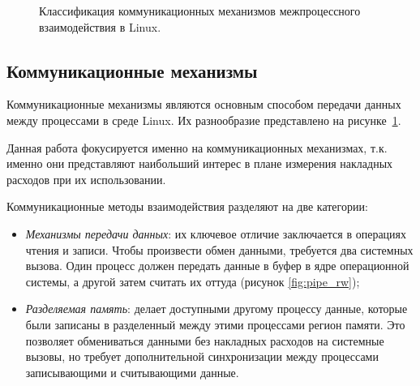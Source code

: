 \documentclass[14pt, russian]{scrartcl}
\newcommand{\refImage}[1]{(рисунок \ref{#1})}
\begin{document}
\begin{figure}[H]
\begin{minipage}[t]{\textwidth}
  \end{minipage}
  \caption{Классификация коммуникационных механизмов межпроцессного взаимодействия в Linux.}
  \label{fig:communication_ipc_taxonomy}
\end{figure}

\subsection{Коммуникационные механизмы}

Коммуникационные механизмы являются основным способом передачи данных между
процессами в среде Linux. Их разнообразие представлено на
рисунке~\ref{fig:communication_ipc_taxonomy}.

Данная работа фокусируется именно на коммуникационных механизмах, т.к. именно
они представляют наибольший интерес в плане измерения накладных расходов при их
использовании.

Коммуникационные методы взаимодействия разделяют на две
категории:\cite{kerrisk2010linux}

\begin{itemize}
  \item \emph{Механизмы передачи данных}: их ключевое отличие заключается в
        операциях чтения и записи. Чтобы произвести обмен данными, требуется два
        системных вызова. Один процесс должен передать данные в буфер в ядре
        операционной системы, а другой затем считать их оттуда
        \refImage{fig:pipe_rw};
  \item \emph{Разделяемая память}: делает доступными другому процессу данные,
        которые были записаны в разделенный между этими процессами регион
        памяти. Это позволяет обмениваться данными без накладных расходов на
        системные вызовы, но требует дополнительной синхронизации между
        процессами записывающими и считывающими данные.
\end{itemize}
\end{document}
